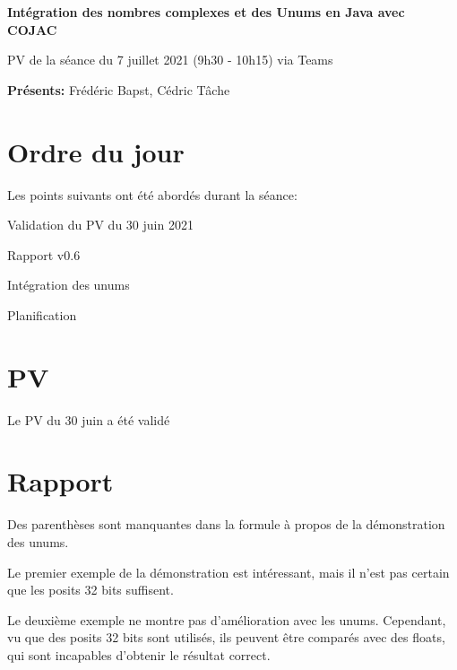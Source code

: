 \documentclass[11pt]{meetingmins}
\date{7 juillet 2021}
\begin{document}
\begin {center} {
    \large \textbf {Intégration des nombres complexes et des Unums en Java avec COJAC}
}
\vspace {0.5ex}

PV de la séance du 7 juillet 2021 (9h30 - 10h15) via Teams
\end {center} \vspace {1.5em}

\noindent
\textbf{Présents:} Frédéric Bapst, Cédric Tâche

\section{Ordre du jour}
Les points suivants ont été abordés durant la séance:
\begin{hiddenitems}
    \item Validation du PV du 30 juin 2021
    \item Rapport v0.6
    \item Intégration des unums
    \item Planification
\end{hiddenitems}

\section{PV}
\begin{hiddenitems}
    \item Le PV du 30 juin a été validé
\end{hiddenitems}

\section{Rapport}
\begin{hiddenitems}
    \item Des parenthèses sont manquantes dans la formule à propos de la démonstration des unums.
    \item Le premier exemple de la démonstration est intéressant, mais il n'est pas certain que les posits 32 bits suffisent.
    \item Le deuxième exemple ne montre pas d'amélioration avec les unums. Cependant, vu que des posits 32 bits sont utilisés, ils peuvent être comparés avec des floats, qui sont incapables d'obtenir le résultat correct.
\end{hiddenitems}
\end{document}
